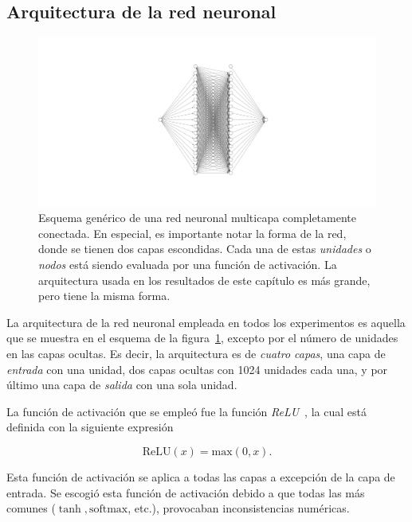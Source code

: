 \subsection{Arquitectura de la red neuronal}

\begin{figure}[t]
    \includegraphics[width=\textwidth]{figuras/capitulo-3/neural-network.pdf}
    \vspace{-1.5cm}
    \caption{Esquema genérico de una red neuronal multicapa completamente conectada. En especial, es importante notar la forma de la red, donde se tienen dos capas escondidas. Cada una de estas \emph{unidades} o \emph{nodos} está siendo evaluada por una función de activación. La arquitectura usada en los resultados de este capítulo es más grande, pero tiene la misma forma.}
    \label{fig:nn-esquema}
\end{figure}

La arquitectura de la red neuronal empleada en todos los experimentos es aquella que se
muestra en el esquema de la figura~\ref{fig:nn-esquema}, excepto por el número de unidades
en las capas ocultas.
Es decir, la arquitectura es de \emph{cuatro capas}, una capa de \emph{entrada} con una
unidad, dos capas ocultas con 1024 unidades cada una, y por último una capa de \emph{salida}
con una sola unidad.

La función de activación que se empleó fue la función \emph{ReLU}~\cite{glorotDeepSparseRectifier2011},
la cual está definida con la siguiente expresión

\begin{equation*}
    \text{ReLU}(x) = \text{max}{(0, x)} .
\end{equation*}

Esta función de activación se aplica a todas las capas a excepción de la capa de entrada.
Se escogió esta función de activación debido a que todas las más comunes ($\tanh, \text{softmax}$, etc.),
provocaban inconsistencias numéricas.

